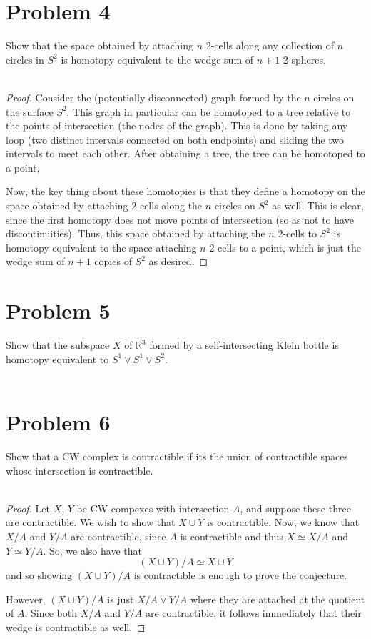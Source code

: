 \documentclass[fontsize=11pt]{scrartcl} %
\numberwithin{equation}{section} %
\numberwithin{figure}{section} %
\numberwithin{table}{section} %
\newcommand{\R}{\mathbb{R}}
\begin{document}
\section*{Problem 4}
Show that the space obtained by attaching $n$ 2-cells along any collection of
$n$ circles in $S^2$ is homotopy equivalent to the wedge sum of $n+1$ 2-spheres.
\\
\\
\begin{proof}
    Consider the (potentially disconnected) graph formed by the $n$ circles on the surface $S^2$. This
    graph in particular can be homotoped to a tree relative to the points of
    intersection (the nodes of the graph). This is done by taking any loop (two
    distinct intervals connected on both endpoints) and sliding the two
    intervals to meet each other. After obtaining a tree, the tree can be
    homotoped to a point,

    Now, the key thing about these homotopies is that they define a homotopy on
    the space obtained by attaching $2$-cells along the $n$ circles on $S^2$ as
    well. This is clear, since the first homotopy does not move points of
    intersection (so as not to have discontinuities). Thus, this space obtained
    by attaching the $n$ $2$-cells to $S^2$ is homotopy equivalent to the space
    attaching $n$ $2$-cells to a point, which is just the wedge sum of $n+1$
    copies of $S^2$ as desired.
\end{proof}

\newpage

\section*{Problem 5}
Show that the subspace $X$ of $\R^3$ formed by a self-intersecting Klein bottle
is homotopy equivalent to $S^1\vee S^1\vee S^2$.
\\
\\

\newpage

\section*{Problem 6}
Show that a CW complex is contractible if its the union of contractible spaces
whose intersection is contractible.
\\
\\
\begin{proof}
    Let $X$, $Y$ be CW compexes with intersection $A$, and suppose these three
    are contractible. We wish to show that $X\cup Y$ is contractible. Now, we
    know that $X/{A}$ and $Y/{A}$ are contractible, since $A$ is contractible
    and thus $X\simeq X/{A}$ and $Y\simeq Y/{A}$. So, we also have that
    \[
        (X\cup Y)/{A} \simeq X\cup Y
    \]
    and so showing $(X\cup Y)/{A}$ is contractible is enough to prove the
    conjecture. 

    However, $(X\cup Y)/{A}$ is just $X/{A}\vee Y/{A}$ where they are attached
    at the quotient of $A$. Since both $X/{A}$ and $Y/{A}$ are contractible, it
    follows immediately that their wedge is contractible as well.
\end{proof}
\end{document}

